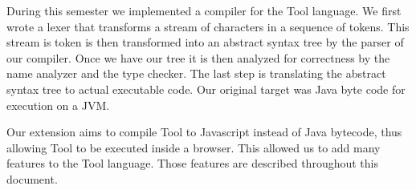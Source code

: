 During this semester we implemented a compiler for the Tool language.
We first wrote a lexer that transforms a stream of characters in a sequence of tokens.
This stream is token is then transformed into an abstract syntax tree by the parser of our compiler.
Once we have our tree it is then analyzed for correctness by the name analyzer and the type checker.
The last step is translating the abstract syntax tree to actual executable code. Our original target was Java byte code for execution on a JVM.

Our extension aims to compile Tool to Javascript instead of Java bytecode, thus allowing Tool to be executed inside a browser. This allowed us to add many features to the Tool language. Those features are described throughout this document.
